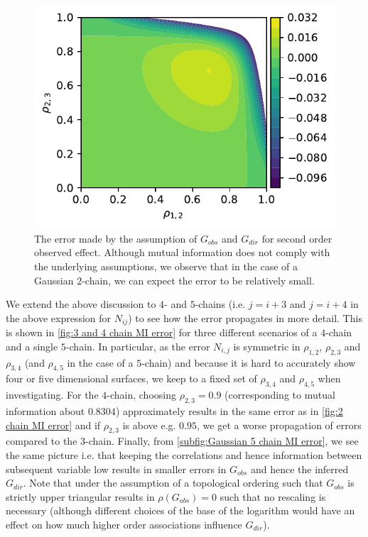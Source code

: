 \documentclass[../Thesis.tex]{subfiles}
\begin{document}
\begin{figure}[h]
    \centering
    \includegraphics[width=.7\linewidth]{figures/Gaussian Chain Theoretical/2 chain error - MI.pdf}
    \caption{The error made by the assumption of $G_{obs}$ and $G_{dir}$ for second order observed effect. Although mutual information does not comply with the underlying assumptions, we observe that in the case of a Gaussian $2$-chain, we can expect the error to be relatively small.}
    \label{fig:2 chain MI error}
\end{figure}

We extend the above discussion to $4$- and $5$-chains (i.e. $j = i + 3$ and $j = i + 4$ in the above expression for $N_{ij}$) to see how the error propagates in more detail. This is shown in \autoref{fig:3 and 4 chain MI error} for three different scenarios of a $4$-chain and a single $5$-chain. In particular, as the error $N_{i,j}$ is symmetric in $\rho_{1,2}$, $\rho_{2,3}$ and $\rho_{3,4}$ (and $\rho_{4,5}$ in the case of a $5$-chain) and because it is hard to accurately show four or five dimensional surfaces, we keep to a fixed set of $\rho_{3,4}$ and $\rho_{4,5}$ when investigating. For the $4$-chain, choosing $\rho_{2,3} = 0.9$ (corresponding to mutual information about $0.8304$) approximately results in the same error as in \autoref{fig:2 chain MI error} and if $\rho_{2,3}$ is above e.g. $0.95$, we get a worse propagation of errors compared to the $3$-chain. Finally, from \autoref{subfig:Gaussian 5 chain MI error}, we see the same picture i.e. that keeping the correlations and hence information between subsequent variable low results in smaller errors in $G_{obs}$ and hence the inferred $G_{dir}$. Note that under the assumption of a topological ordering such that $G_{obs}$ is strictly upper triangular results in $\rho\left(G_{obs}\right) = 0$ such that no rescaling is necessary (although different choices of the base of the logarithm would have an effect on how much higher order associations influence $G_{dir}$).
\end{document}

